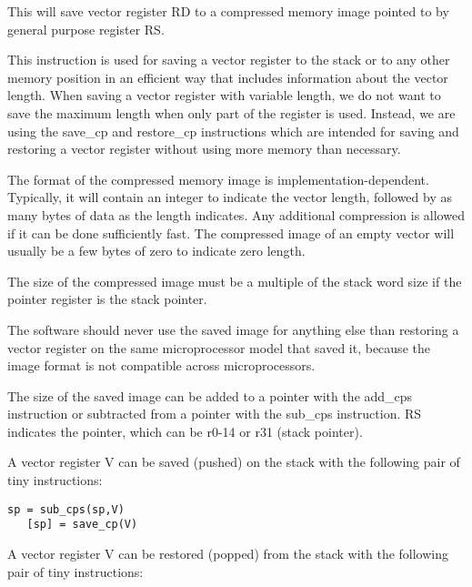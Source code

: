 \documentclass[forwardcom.tex]{subfiles}
\begin{document}
This will save vector register RD to a compressed memory image pointed to by general purpose register RS.
\vspace{2mm}

This instruction is used for saving a vector register to the stack or to any other memory position in an efficient way that includes information about the vector length. When saving a vector register with variable length, we do not want to save the maximum length when only part of the register is used. Instead, we are using the save\_cp and restore\_cp instructions which are intended for saving and restoring a vector register without using more memory than necessary.

\vspace{2mm}

The format of the compressed memory image is implementation-dependent. Typically, it will contain an integer to indicate the vector length, followed by as many bytes of data as the length indicates. Any additional compression is allowed if it can be done sufficiently fast.
The compressed image of an empty vector will usually be a few bytes of zero to indicate zero length.
\vspace{2mm}

The size of the compressed image must be a multiple of the stack word size if the pointer register is the stack pointer.
\vspace{2mm}

The software should never use the saved image for anything else than restoring a vector register on the same microprocessor model that saved it, because the image format is not compatible across microprocessors.
\vspace{2mm}

The size of the saved image can be added to a pointer with the add\_cps instruction or subtracted from a pointer with the sub\_cps instruction. RS indicates the pointer, which can be r0-14 or r31 (stack pointer).
\vspace{2mm}

A vector register V can be saved (pushed) on the stack with the following pair of tiny instructions:

\begin{lstlisting}[frame=none]
   sp = sub_cps(sp,V)
   [sp] = save_cp(V)
\end{lstlisting}

A vector register V can be restored (popped) from the stack with the following pair of tiny instructions:
\end{document}
